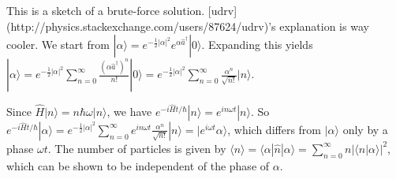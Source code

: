 \documentclass{article}
\begin{document}
This is a sketch of a brute-force solution.  [udrv](http://physics.stackexchange.com/users/87624/udrv)'s explanation is way cooler.  We start from $|\alpha\rangle = e^{-\frac12|\alpha|^2}e^{\alpha\hat a^\dagger}|0\rangle$.  Expanding this yields $|\alpha\rangle = e^{-\frac12|\alpha|^2}\sum_{n=0}^\infty\frac{(\alpha \hat a^\dagger)^n}{n!}|0\rangle=e^{-\frac12|\alpha|^2}\sum_{n=0}^\infty\frac{\alpha^n}{\sqrt{n!}}|n\rangle$.

Since $\hat H|n\rangle = n\hbar \omega|n\rangle$, we have $e^{-i\hat H t/\hbar}|n\rangle = e^{i n \omega t}|n\rangle$.  So $e^{-i\hat H t/\hbar}|\alpha\rangle = e^{-\frac12|\alpha|^2}\sum_{n=0}^\infty e^{i n \omega t}\frac{\alpha^n}{\sqrt{n!}}|n\rangle = |e^{i\omega t} \alpha\rangle$, which differs from $|\alpha\rangle$ only by a phase $\omega t$. The number of particles is given by $\langle n\rangle = \langle\alpha|\hat n|\alpha\rangle = \sum_{n=0}^\infty n |\langle n | \alpha\rangle|^2$, which can be shown to be independent of the phase of $\alpha$.
\end{document}

